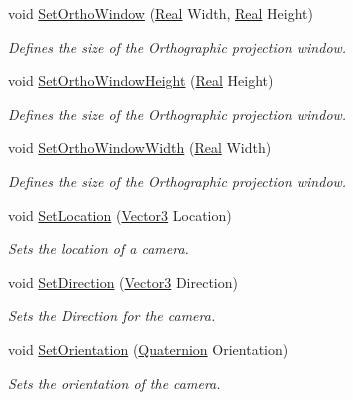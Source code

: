 \begin{DoxyCompactItemize}
void \hyperlink{classphys_1_1Camera_a6a5b1aa3d453486354b24b7e4b918988}{SetOrthoWindow} (\hyperlink{namespacephys_af7eb897198d265b8e868f45240230d5f}{Real} Width, \hyperlink{namespacephys_af7eb897198d265b8e868f45240230d5f}{Real} Height)
\begin{DoxyCompactList}\small\item\em Defines the size of the Orthographic projection window. \item\end{DoxyCompactList}\item 
void \hyperlink{classphys_1_1Camera_a41f859ab51712fb465416e4c7edd29ff}{SetOrthoWindowHeight} (\hyperlink{namespacephys_af7eb897198d265b8e868f45240230d5f}{Real} Height)
\begin{DoxyCompactList}\small\item\em Defines the size of the Orthographic projection window. \item\end{DoxyCompactList}\item 
void \hyperlink{classphys_1_1Camera_abe6bb6c5d46ca588026fb163b4e5d387}{SetOrthoWindowWidth} (\hyperlink{namespacephys_af7eb897198d265b8e868f45240230d5f}{Real} Width)
\begin{DoxyCompactList}\small\item\em Defines the size of the Orthographic projection window. \item\end{DoxyCompactList}\item 
void \hyperlink{classphys_1_1Camera_ab1fb572982464212b2fa33e2df6f688b}{SetLocation} (\hyperlink{classphys_1_1Vector3}{Vector3} Location)
\begin{DoxyCompactList}\small\item\em Sets the location of a camera. \item\end{DoxyCompactList}\item 
void \hyperlink{classphys_1_1Camera_a50746cdd4f7d483edffe87d24d2b4bc6}{SetDirection} (\hyperlink{classphys_1_1Vector3}{Vector3} Direction)
\begin{DoxyCompactList}\small\item\em Sets the Direction for the camera. \item\end{DoxyCompactList}\item 
void \hyperlink{classphys_1_1Camera_af0822410414622c2a3c8b4da207b53ab}{SetOrientation} (\hyperlink{classphys_1_1Quaternion}{Quaternion} Orientation)
\begin{DoxyCompactList}\small\item\em Sets the orientation of the camera. \item\end{DoxyCompactList}\item 

\end{DoxyCompactItemize}
